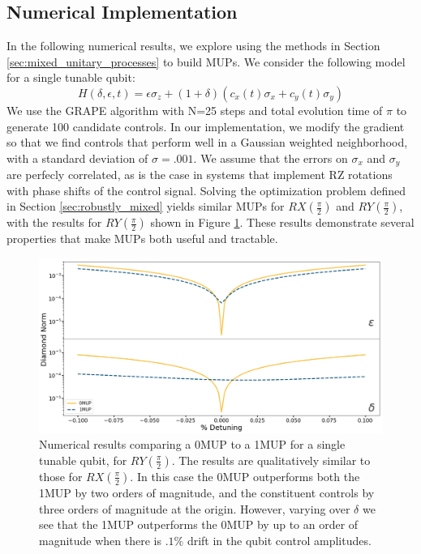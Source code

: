 \documentclass[aps,nofootinbib,pra,notitlepage,twocolumn]{revtex4-1}
\begin{document}
\subsection{Numerical Implementation}
\label{sec:numerical_results}
\label{one_qubit_performance}
In the following numerical results, we explore using the methods in Section \ref{sec:mixed_unitary_processes} to build MUPs. We consider the following model for a single tunable qubit: 
\begin{equation}\label{eq:1Qham}
  H(\delta, \epsilon, t) = \epsilon\sigma_z + (1 + \delta)(c_x(t)\sigma_x + c_y(t)\sigma_y)
\end{equation}
We use the GRAPE algorithm\cite{Khaneja2005} with N=25 steps and total evolution time of $\pi$ to generate 100 candidate controls. In our implementation, we modify the gradient so that we find controls that perform well in a Gaussian weighted neighborhood, with a standard deviation of $\sigma=.001$. We assume that the errors on $\sigma_x$ and $\sigma_y$ are perfecly correlated, as is the case in systems that implement RZ rotations with phase shifts of the control signal. Solving the optimization problem defined in Section \ref{sec:robustly_mixed} yields similar MUPs for $RX(\frac{\pi}{2})$ and $RY(\frac{\pi}{2})$, with the results for $RY(\frac{\pi}{2})$ shown in Figure \ref{fig:YMUP}. These results demonstrate several properties that make MUPs both useful and tractable.

\begin{figure}
  \centering
  \includegraphics[width=\columnwidth]{SQRTY_no_member.png}
  \caption{Numerical results comparing a 0MUP to a 1MUP for a single tunable qubit, for $RY(\frac{\pi}{2})$. The results are qualitatively similar to those for $RX(\frac{\pi}{2})$. In this case the 0MUP outperforms both the 1MUP by two orders of magnitude, and the constituent controls by three orders of magnitude at the origin. However, varying over $\delta$ we see that the 1MUP outperforms the 0MUP by up to an order of magnitude when there is $.1\%$ drift in the qubit control amplitudes.}
  \label{fig:YMUP}
\end{figure}
\end{document}
